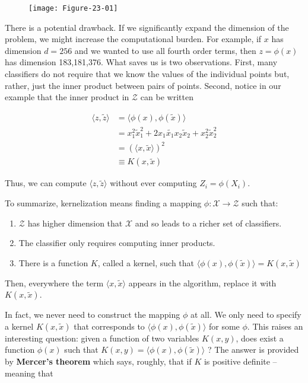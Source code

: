 \begin{figure}[H]
\texttt{[image: Figure-23-01]}
\end{figure}

There is a potential drawback. If we significantly expand the dimension
of the problem, we might increase the computational burden. For example,
if \(x\) has dimension \(d = 256\) and we wanted to use all fourth order
terms, then \(z = \phi(x)\) has dimension 183,181,376. What saves us is
two observations. First, many classifiers do not require that we know
the values of the individual points but, rather, just the inner product
between pairs of points. Second, notice in our example that the inner
product in \(\mathcal{Z}\) can be written

\[ 
\begin{align}
\langle z, \tilde{z} \rangle &= \langle \phi(x), \phi(\tilde{x}) \rangle \\
&= x_1^2 \tilde{x}_1^2 + 2 x_1 \tilde{x_1} x_2 \tilde{x}_2 + x_2^2 \tilde{x}_2^2 \\
&= ( \langle x, \tilde{x} \rangle )^2 \\
&\equiv K(x, \tilde{x})
\end{align}
\]

Thus, we can compute \(\langle z, \tilde{z} \rangle\) without ever
computing \(Z_i = \phi(X_i)\).

To summarize, kernelization means finding a mapping
\(\phi: \mathcal{X} \rightarrow \mathcal{Z}\) such that:

\begin{enumerate}
\def\labelenumi{\arabic{enumi}.}
\item
  \(\mathcal{Z}\) has higher dimension that \(\mathcal{X}\) and so leads
  to a richer set of classifiers.
\item
  The classifier only requires computing inner products.
\item
  There is a function \(K\), called a kernel, such that
  \(\langle \phi(x), \phi(\tilde{x}) \rangle = K(x, \tilde{x})\)
\end{enumerate}

Then, everywhere the term \(\langle x, \tilde{x} \rangle\) appears in
the algorithm, replace it with \(K(x, \tilde{x})\).

In fact, we never need to construct the mapping \(\phi\) at all. We only
need to specify a kernel \(K(x, \tilde{x})\) that corresponds to
\(\langle \phi(x), \phi(\tilde{x}) \rangle\) for some \(\phi\). This
raises an interesting question: given a function of two variables
\(K(x, y)\), does exist a function \(\phi(x)\) such that
\(K(x, y) = \langle \phi(x), \phi(\tilde{x}) \rangle\) ? The answer is
provided by \textbf{Mercer's theorem} which says, roughly, that if \(K\)
is positive definite -- meaning that

